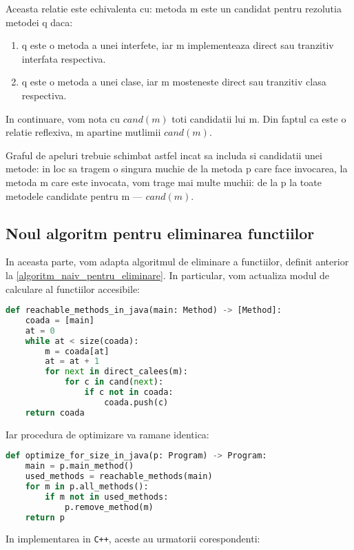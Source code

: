 Aceasta relatie este echivalenta cu: metoda m este un candidat pentru rezolutia
metodei q daca:
\begin{enumerate}
    \item q este o metoda a unei interfete, iar m implementeaza direct sau
        tranzitiv interfata respectiva.
    \item q este o metoda a unei clase, iar m mosteneste direct sau tranzitiv
        clasa respectiva.
\end{enumerate}

In continuare, vom nota cu $cand(m)$ toti candidatii lui m. Din faptul ca este o
relatie reflexiva, m apartine mutlimii $cand(m)$.

Graful de apeluri trebuie schimbat astfel incat sa includa si candidatii unei
metode: in loc sa tragem o singura muchie de la metoda p care face invocarea, la
metoda m care este invocata, vom trage mai multe muchii: de la p la toate
metodele candidate pentru m --- $cand(m)$.

\subsection{Noul algoritm pentru eliminarea functiilor}

In aceasta parte, vom adapta algoritmul de eliminare a functiilor, definit
anterior la \ref{algoritm_naiv_pentru_eliminare}.
In particular, vom actualiza modul de calculare al functiilor accesibile:

\begin{lstlisting}[language=Python]
def reachable_methods_in_java(main: Method) -> [Method]:
    coada = [main]
    at = 0
    while at < size(coada):
        m = coada[at]
        at = at + 1
        for next in direct_calees(m):
            for c in cand(next):
                if c not in coada:
                    coada.push(c)
    return coada
\end{lstlisting}


Iar procedura de optimizare va ramane identica:

\begin{lstlisting}[language=Python]
def optimize_for_size_in_java(p: Program) -> Program:
    main = p.main_method()
    used_methods = reachable_methods(main)
    for m in p.all_methods():
        if m not in used_methods:
            p.remove_method(m)
    return p
\end{lstlisting}


In implementarea in \texttt{C++}, aceste au urmatorii corespondenti:

